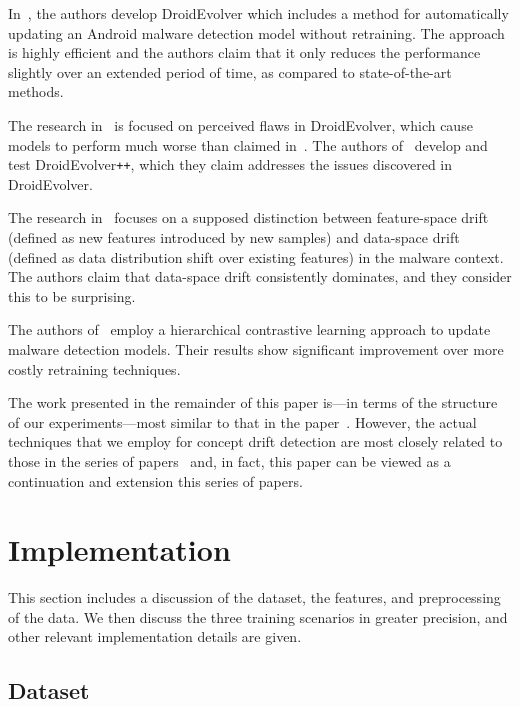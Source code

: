 \documentclass[12pt]{article}
\begin{document}
In~\cite{Xu}, the authors develop DroidEvolver which includes a method 
for automatically updating an Android malware
detection model without retraining. The approach is highly efficient 
and the authors claim that it only reduces the performance
slightly over an extended period of time, as compared to state-of-the-art methods.

The research in~\cite{Kan} is focused on perceived flaws in DroidEvolver, which cause models
to perform much worse than claimed in~\cite{Xu}. The authors of~\cite{Kan} develop and test
DroidEvolver\texttt{++}, which they claim addresses the issues discovered in DroidEvolver.

The research in~\cite{Chen} focuses on a supposed distinction between 
feature-space drift (defined as new features introduced by new 
samples) and data-space drift (defined as data distribution 
shift over existing features) in the malware context. The authors 
claim that data-space drift consistently dominates, and they consider
this to be surprising.

The authors of~\cite{Yizheng} employ a hierarchical contrastive learning approach to update 
malware detection models. Their results show significant improvement over more costly 
retraining techniques.

The work presented in the remainder of this paper
is---in terms of the structure of our experiments---most similar to that in the paper~\cite{Molina}.
However, the actual techniques that we employ for concept drift detection are 
most closely related to those in the series of papers~\cite{Sunhera,Lolitha,Mayuri}
and, in fact, this paper can be viewed as a continuation and extension this series of papers.

\section{Implementation}\label{chap:imp}

This section includes a discussion of the dataset, the features, and preprocessing of the data.
We then discuss the three training scenarios in greater precision, and other relevant implementation 
details are given.

\subsection{Dataset}
\end{document}
